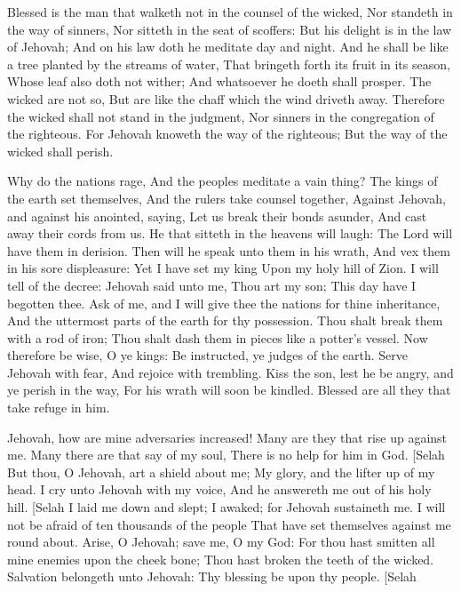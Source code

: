 


Blessed is the man that walketh not in the counsel of the wicked, Nor standeth in the way of sinners, Nor sitteth in the seat of scoffers:  But his delight is in the law of Jehovah; And on his law doth he meditate day and night.  And he shall be like a tree planted by the streams of water, That bringeth forth its fruit in its season, Whose leaf also doth not wither; And whatsoever he doeth shall prosper.  The wicked are not so, But are like the chaff which the wind driveth away.  Therefore the wicked shall not stand in the judgment, Nor sinners in the congregation of the righteous.  For Jehovah knoweth the way of the righteous; But the way of the wicked shall perish. 

Why do the nations rage, And the peoples meditate a vain thing?  The kings of the earth set themselves, And the rulers take counsel together, Against Jehovah, and against his anointed, saying,  Let us break their bonds asunder, And cast away their cords from us.  He that sitteth in the heavens will laugh: The Lord will have them in derision.  Then will he speak unto them in his wrath, And vex them in his sore displeasure:  Yet I have set my king Upon my holy hill of Zion.  I will tell of the decree: Jehovah said unto me, Thou art my son; This day have I begotten thee.  Ask of me, and I will give thee the nations for thine inheritance, And the uttermost parts of the earth for thy possession.  Thou shalt break them with a rod of iron; Thou shalt dash them in pieces like a potter’s vessel.  Now therefore be wise, O ye kings: Be instructed, ye judges of the earth.  Serve Jehovah with fear, And rejoice with trembling.  Kiss the son, lest he be angry, and ye perish in the way, For his wrath will soon be kindled. Blessed are all they that take refuge in him. 

Jehovah, how are mine adversaries increased! Many are they that rise up against me.  Many there are that say of my soul, There is no help for him in God. [Selah  But thou, O Jehovah, art a shield about me; My glory, and the lifter up of my head.  I cry unto Jehovah with my voice, And he answereth me out of his holy hill. [Selah  I laid me down and slept; I awaked; for Jehovah sustaineth me.  I will not be afraid of ten thousands of the people That have set themselves against me round about.  Arise, O Jehovah; save me, O my God: For thou hast smitten all mine enemies upon the cheek bone; Thou hast broken the teeth of the wicked.  Salvation belongeth unto Jehovah: Thy blessing be upon thy people. [Selah 

